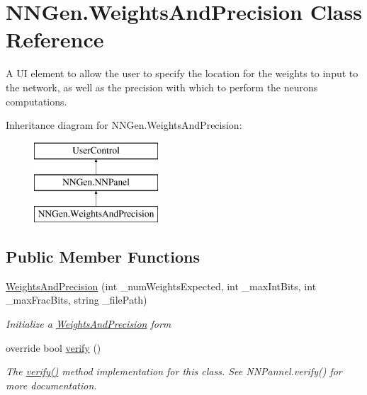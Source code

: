 \hypertarget{class_n_n_gen_1_1_weights_and_precision}{}\section{N\+N\+Gen.\+Weights\+And\+Precision Class Reference}
\label{class_n_n_gen_1_1_weights_and_precision}


A U\+I element to allow the user to specify the location for the weights to input to the network, as well as the precision with which to perform the neuron\textquotesingle{}s computations.  


Inheritance diagram for N\+N\+Gen.\+Weights\+And\+Precision\+:\begin{figure}[H]
\begin{center}
\leavevmode
\includegraphics[height=3.000000cm]{class_n_n_gen_1_1_weights_and_precision}
\end{center}
\end{figure}
\subsection*{Public Member Functions}
\begin{DoxyCompactItemize}
\item 
\hyperlink{class_n_n_gen_1_1_weights_and_precision_a16fd27e0739e8a26bbf6f9585e173c7e}{Weights\+And\+Precision} (int \+\_\+num\+Weights\+Expected, int \+\_\+max\+Int\+Bits, int \+\_\+max\+Frac\+Bits, string \+\_\+file\+Path)
\begin{DoxyCompactList}\small\item\em Initialize a \hyperlink{class_n_n_gen_1_1_weights_and_precision}{Weights\+And\+Precision} form \end{DoxyCompactList}\item 
override bool \hyperlink{class_n_n_gen_1_1_weights_and_precision_a55e25affc261256144c0cd9866a63b7a}{verify} ()
\begin{DoxyCompactList}\small\item\em The \hyperlink{class_n_n_gen_1_1_weights_and_precision_a55e25affc261256144c0cd9866a63b7a}{verify()} method implementation for this class. See N\+N\+Pannel.\+verify() for more documentation. \end{DoxyCompactList}\end{DoxyCompactItemize}
